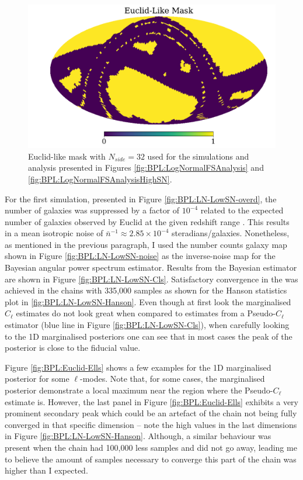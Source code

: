 \begin{figure}
\begin{center}
\includegraphics[scale=0.40]{BPL-FIGS/Euclid-Foot-N32.pdf}
\caption[Euclid-like mask with $N_{side} = 32$]{Euclid-like mask with $N_{side} = 32$ used for the simulations and analysis presented in Figures \ref{fig:BPL:LogNormalFSAnalysis} and \ref{fig:BPL:LogNormalFSAnalysisHighSN}.}
\label{fig:BPL:EuclidMask}
\end{center}
\end{figure}

\qquad For the first simulation, presented in Figure \ref{fig:BPL:LN-LowSN-overd}, the number of galaxies was suppressed by a factor of $10^{-4}$ related to the expected number of galaxies observed by Euclid at the given redshift range \citep{2011EuclidRedPaper}. This results in a mean isotropic noise of $\bar{n}^{-1}\approx 2.85\times 10^{-4}$ steradians/galaxies. Nonetheless, as mentioned in the previous paragraph, I used the number counts galaxy map shown in Figure \ref{fig:BPL:LN-LowSN-noise} as the inverse-noise map for the Bayesian angular power spectrum estimator. Results from the Bayesian estimator are shown in Figure \ref{fig:BPL:LN-LowSN-Cls}. Satisfactory convergence in the was achieved in the chains with 335,000 samples as shown for the Hanson statistics plot in \ref{fig:BPL:LN-LowSN-Hanson}. Even though at first look the marginalised $C_{\ell}$ estimates do not look great when compared to estimates from a Pseudo-$C_{\ell}$ estimator (blue line in Figure \ref{fig:BPL:LN-LowSN-Cls}), when carefully looking to the 1D marginalised posteriors one can see that in most cases the peak of the posterior is close to the fiducial value. 

\qquad Figure \ref{fig:BPL:Euclid-Ells} shows a few examples for the 1D marginalised posterior for some $\ell$-modes. Note that, for some cases, the marginalised posterior demonstrate a local maximum near the region where the Pseudo-$C_{\ell}$ estimate is. However, the last panel in Figure \ref{fig:BPL:Euclid-Ells} exhibits a very prominent secondary peak which could be an artefact of the chain not being fully converged in that specific dimension -- note the high values in the last dimensions in Figure \ref{fig:BPL:LN-LowSN-Hanson}. Although, a similar behaviour was present when the chain had 100,000 less samples and did not go away, leading me to believe the amount of samples necessary to converge this part of the chain was higher than I expected.

